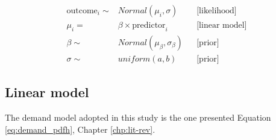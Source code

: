 


\begin{align}
\label{eq:model}
\text{outcome}_i \sim& Normal(\mu_i, \sigma) && \text{[likelihood]} \\
\mu_i =& \beta \times \text{predictor}_i     && \text{[linear model]}\nonumber\\
\beta \sim& Normal (\mu_\beta, \sigma_\beta) && \text{[prior]}\nonumber\\
\sigma \sim& uniform(a,b) \nonumber          && \text{[prior]}
\end{align}


\subsection{Linear model}

The demand model adopted in this study is the one presented Equation \ref{eq:demand_pdfh}, Chapter \ref{chp:lit-rev}. 






